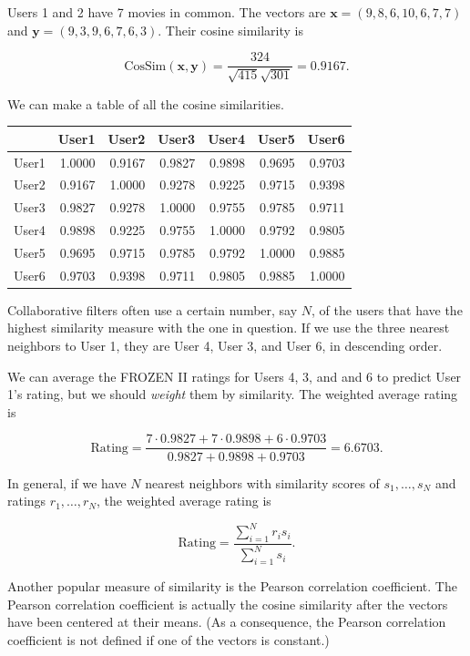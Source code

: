 \documentclass[
]{book}
\theoremstyle{definition}
\theoremstyle{definition}
\theoremstyle{definition}
\theoremstyle{definition}
\theoremstyle{remark}
\begin{document}
Users 1 and 2 have 7 movies in common. The vectors are
\(\mathbf{x}=(9,8,6,10,6,7,7)\) and \(\mathbf{y}=(9,3,9,6,7,6,3).\) Their cosine similarity is

\[\text{CosSim}(\mathbf{x},\mathbf{y})=\frac{324}{\sqrt{415}\sqrt{301}}=0.9167.\]

We can make a table of all the cosine similarities.

\begin{longtable}{lrrrrrr}
\toprule
  & User1 & User2 & User3 & User4 & User5 & User6\\
\midrule
User1 & 1.0000 & 0.9167 & 0.9827 & 0.9898 & 0.9695 & 0.9703\\
User2 & 0.9167 & 1.0000 & 0.9278 & 0.9225 & 0.9715 & 0.9398\\
User3 & 0.9827 & 0.9278 & 1.0000 & 0.9755 & 0.9785 & 0.9711\\
User4 & 0.9898 & 0.9225 & 0.9755 & 1.0000 & 0.9792 & 0.9805\\
User5 & 0.9695 & 0.9715 & 0.9785 & 0.9792 & 1.0000 & 0.9885\\
User6 & 0.9703 & 0.9398 & 0.9711 & 0.9805 & 0.9885 & 1.0000\\
\bottomrule
\end{longtable}

Collaborative filters often use a certain number, say \(N\), of the users that have the highest similarity measure with the one in question. If we use the three nearest neighbors to User 1, they are User 4, User 3, and User 6, in descending order.

We can average the FROZEN II ratings for Users 4, 3, and and 6 to predict User 1's rating, but we should \emph{weight} them by similarity. The weighted average rating is

\[\text{Rating}=\frac{7\cdot 0.9827+7\cdot 0.9898+6\cdot 0.9703}{0.9827+0.9898+0.9703}=6.6703.\]

In general, if we have \(N\) nearest neighbors with similarity scores of \(s_1,\dots,s_N\) and ratings \(r_1,\dots,r_N\), the weighted average rating is

\[\text{Rating}=\frac{\sum_{i=1}^N r_i s_i}{\sum_{i=1}^N s_i}.\]

Another popular measure of similarity is the Pearson correlation coefficient. The Pearson correlation coefficient is actually the cosine similarity after the vectors have been centered at their means. (As a consequence, the Pearson correlation coefficient is not defined if one of the vectors is constant.)
\end{document}
